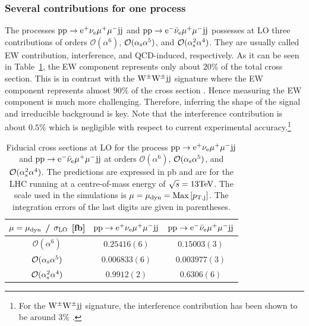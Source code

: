 \documentclass[11pt]{cernrep}
\begin{document}
\subsubsection*{Several contributions for one process}

The processes ${\rm p} {\rm p} \to {\rm e}^+  \nu_{\rm e}  \mu^+ \mu^- {\rm j} {\rm j}$  and ${\rm p} {\rm p} \to {\rm e}^-  \bar \nu_{\rm e}  \mu^+ \mu^- {\rm j} {\rm j}$
possesses at LO three contributions of orders $\mathcal{O} (\alpha^6)$, $\mathcal{O} (\alpha_{\rm s}\alpha^5)$, and $\mathcal{O} (\alpha_{\rm s}^2\alpha^4)$.
They are usually called EW contribution, interference, and QCD-induced, respectively.
As it can be seen in Table~\ref{table:xsectallLOdyn}, the EW component represents only about $20\%$ of the total cross section.
This is in contrast with the ${\rm W}^\pm{\rm W}^\pm{\rm j}{\rm j}$ signature where the EW component represents almost $90\%$ of the cross section \cite{Biedermann:2017bss}.
Hence measuring the EW component is much more challenging.
Therefore, inferring the shape of the signal and irreducible background is key.
Note that the interference contribution is about $0.5\%$ which is negligible with respect to current experimental accuracy.\footnote{For the ${\rm W}^\pm{\rm W}^\pm{\rm j}{\rm j}$ signature, the interference contribution has been shown to be around $3\%$ \cite{Biedermann:2017bss}.}

\begin{table}
\begin{center} 
\begin{tabular}{ c | c | c }
 $\mu = \mu_{\rm dyn}$ / $\sigma_{\rm LO}$ [fb] & ${\rm p} {\rm p} \to {\rm e}^+  \nu_{\rm e}  \mu^+ \mu^- {\rm j} {\rm j}$  & ${\rm p} {\rm p} \to {\rm e}^-  \bar \nu_{\rm e}  \mu^+ \mu^- {\rm j} {\rm j}$  \\
  \hline\hline
  $\mathcal{O} (\alpha^6)$                        & $0.25416(6)$  & $0.15003(3)$   \\
  $\mathcal{O} (\alpha_{\rm s}\alpha^5)$          & $0.006833(6)$ & $0.003977(3)$  \\
  $\mathcal{O} (\alpha_{\rm s}^2\alpha^4)$        & $0.9912(2)$   & $0.6306(6)$   \\
  \hline
\end{tabular}
\end{center}
\caption{
Fiducial cross sections at LO for the process ${\rm p}{\rm p}\to{\rm e}^+\nu_{\rm e}\mu^+\mu^-{\rm j}{\rm j}$ and ${\rm p}{\rm p}\to{\rm e}^-\bar\nu_{\rm e}\mu^+\mu^-{\rm j}{\rm j}$ at orders $\mathcal{O} (\alpha^6)$, $\mathcal{O} (\alpha_{\rm s}\alpha^5)$, and $\mathcal{O} (\alpha_{\rm s}^2\alpha^4)$.
The predictions are expressed in pb and are for the LHC running at a centre-of-mass energy of $\sqrt{s}=13 {\rm TeV}$.
The scale used in the simulations is $\mu = \mu_{\rm dyn} = {\rm Max}\left[p_{\rm T, j}\right]$.
The integration errors of the last digits are given in parentheses.}
\label{table:xsectallLOdyn}
\end{table}
\end{document}
